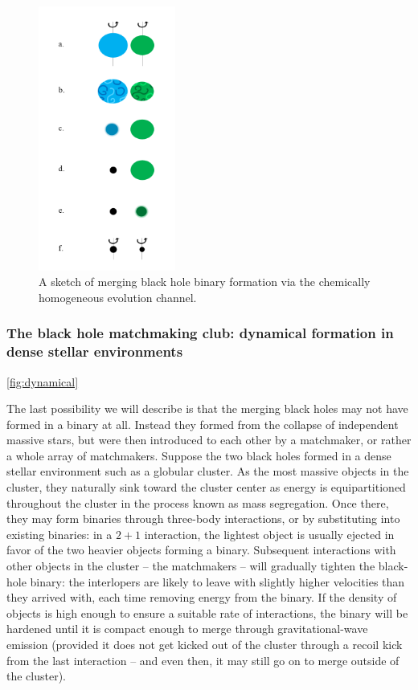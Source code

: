 \documentclass[iop,onecolumn]{revtex4}
\begin{document}
\begin{figure}
	\centering
	\includegraphics[width=0.4\textwidth]{channel2.png}
	\caption{\label{fig:chem_homog} A sketch of merging black hole binary formation via the chemically homogeneous evolution channel.}
\end{figure}

\subsubsection{The black hole matchmaking club: dynamical formation in dense stellar environments}

\autoref{fig:dynamical}

The last possibility we will describe is that the merging black holes may not have formed in a binary at all.  Instead they formed from the collapse of independent massive stars, but were then introduced to each other by a matchmaker, or rather a whole array of matchmakers.  Suppose the two black holes formed in a dense stellar environment such as a globular cluster.  As the most massive objects in the cluster, they naturally sink toward the cluster center as energy is equipartitioned throughout the cluster in the process known as mass segregation.  Once there, they may form binaries through three-body interactions, or by substituting into existing binaries: in a $2+1$ interaction, the lightest object is usually ejected in favor of the two heavier objects forming a binary.  Subsequent interactions with other objects in the cluster -- the matchmakers -- will gradually tighten the black-hole binary: the interlopers are likely to leave with  slightly higher velocities than they arrived with, each time removing energy from the binary.   If the density of objects is high enough to ensure a suitable rate of interactions, the binary will be hardened until it is compact enough to merge through gravitational-wave emission (provided it does not get kicked out of the cluster through a recoil kick from the last interaction -- and even then, it may still go on to merge outside of the cluster).  
\end{document}
